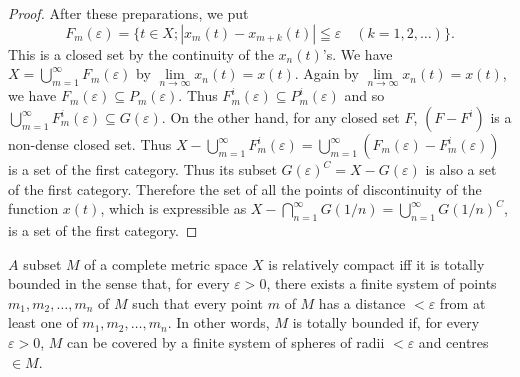 \begin{proof}
After these preparations, we put 
\[
F _{m} (\varepsilon) = \{t \in X; | x _{m} (t)- x _{m+k} (t) | \leqq \varepsilon \quad (k = 1, 2, \dots) \}.
\]
This is a closed set by the continuity of the $x_{n}(t)$'s. We have $X = \bigcup\limits_{m=1}^{\infty} F_{m}(\varepsilon)$ by $\lim\limits_{n \to \infty} x_{n}(t) = x(t)$. Again by $\lim\limits_{n \to \infty} x_{n}(t) = x(t)$, we have $F_{m}(\varepsilon) \subseteq P_{m}(\varepsilon)$. Thus $F_{m}^{i}(\varepsilon) \subseteq P_{m}^{i}(\varepsilon)$ and so $\bigcup\limits_{m=1}^{\infty} F_{m}^{i}(\varepsilon) \subseteq G(\varepsilon)$. On the other hand, for any closed set $F$, $(F- F^{i})$ is a non-dense closed set. Thus $X- \bigcup\limits_{m=1}^{\infty} F_{m}^{i}(\varepsilon) = \bigcup\limits_{m=1}^{\infty} (F_{m}(\varepsilon)- F_{m}^{i}(\varepsilon))$ is a set of the first category. Thus its subset $G(\varepsilon)^{C} = X- G(\varepsilon)$ is also a set of the first category. Therefore the set of all the points of discontinuity of the function $x(t)$, which is expressible as $X- \bigcap\limits_{n=1}^{\infty} G(1/n) = \bigcup\limits_{n=1}^{\infty} G(1/n)^{C}$, is a set of the first category. 
\end{proof}

\begin{theoremu} $A$ subset $M$ of a complete metric space $X$ is relatively compact iff it is totally bounded in the sense that, for every $\varepsilon > 0$, there exists a finite system of points $m_{1}, m_{2}, \ldots, m_{n}$ of $M$ such that every point $m$ of $M$ has a distance $< \varepsilon$ from at least one of $m_{1}, m_{2}, \ldots, m_{n}$. In other words, $M$ is totally bounded if, for every $\varepsilon > 0$, $M$ can be covered by a finite system of spheres of radii $< \varepsilon$ and centres $\in M$. 
\end{theoremu}

